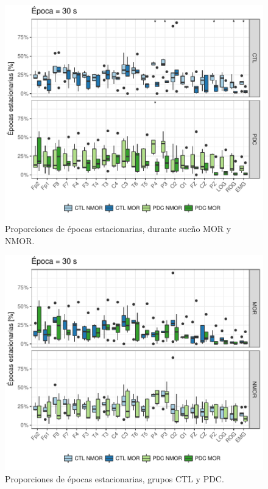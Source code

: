 \begin{figure}
\centering
\includegraphics[width=\linewidth]
{./img_art_dfa/Comparacion_gpos_CTL_PDC_v3.pdf}
\caption{Proporciones de épocas estacionarias, durante sueño MOR y NMOR.}
\label{comparacion_verde}
\end{figure}

\begin{figure}
\centering
\includegraphics[width=\linewidth]
{./img_art_dfa/Comparacion_gpos_MOR_NMOR_v3.pdf}
\caption{Proporciones de épocas estacionarias, grupos CTL y PDC.}
\label{comparacion_graf}
\end{figure}

